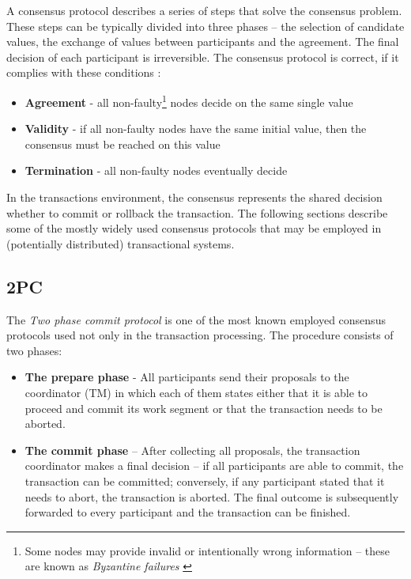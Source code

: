 \documentclass[oneside,
  digital, %
  table,   %
  nolof,     %
  nolot,     %
]{fithesis3}
\begin{document}
A consensus protocol describes a series of steps that solve the consensus problem. These steps can be typically divided into three phases -- the selection of candidate values, the exchange of values between participants and the agreement. The final decision of each participant is irreversible. The consensus protocol is correct, if it complies with these conditions \cite{distributed-computing}:

\begin{itemize}
    \item \textbf{Agreement} - all non-faulty\footnote{Some nodes may provide invalid or intentionally wrong information -- these are known as \textit{Byzantine failures} \cite{byzantine-generals-problem}} nodes decide on the same single value
    \item \textbf{Validity} - if all non-faulty nodes have the same initial value, then the consensus must be reached on this value
    \item \textbf{Termination} - all non-faulty nodes eventually decide
\end{itemize}


In the transactions environment, the consensus represents the shared decision whether to commit or rollback the transaction. The following sections describe some of the mostly widely used consensus protocols that may be employed in (potentially distributed) transactional systems.

\subsection{2PC}

The \textit{Two phase commit protocol} is one of the most known employed consensus protocols used not only in the transaction processing. The procedure consists of two phases:

\begin{itemize}
    \item \textbf{The prepare phase} - All participants send their proposals to the coordinator (TM) in which each of them states either that it is able to proceed and commit its work segment or that the transaction needs to be aborted.
    
    \item \textbf{The commit phase} -- After collecting all proposals, the transaction coordinator makes a final decision -- if all participants are able to commit, the transaction can be committed; conversely, if any participant stated that it needs to abort, the transaction is aborted. The final outcome is subsequently forwarded to every participant and the transaction can be finished.
\end{itemize}
\end{document}
